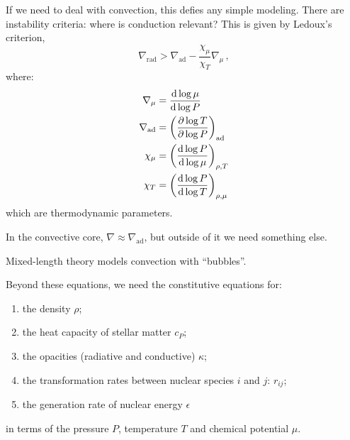 \documentclass[main.tex]{subfiles}
\begin{document}
If we need to deal with convection, this defies any simple modeling. There are instability criteria: where is conduction relevant? This is given by
Ledoux's criterion,
%
\begin{equation}
    \nabla_{\text{rad}} > \nabla_{\text{ad}} - \frac{\chi_\mu}{\chi_T} \nabla_\mu\,,
\end{equation}
%
where:
%
\begin{subequations}
\begin{align}
  \nabla_\mu  &= \dv{\log \mu }{\log P} \\
  \nabla_{\text{ad}}  &= \qty(\pdv{\log T }{\log P} )_{\text{ad}} \\
  \chi_{\mu}  &= \qty(\dv{\log P }{\log \mu} )_{\rho, T} \\
  \chi_{T}  &= \qty(\dv{\log P }{\log T} )_{\rho, \mu}
\end{align}
\end{subequations}
%
which are thermodynamic parameters.


In the convective core, \(\nabla \approx \nabla_{\text{ad}}\), but outside of it we need something else.

Mixed-length theory models convection with ``bubbles''.

Beyond these equations, we need the constitutive equations for:
\begin{enumerate}
    \item the density \(\rho \);
    \item the heat capacity of stellar matter \(c_P\);
    \item the opacities (radiative and conductive) \(\kappa \);
    \item the transformation rates between nuclear species \(i\) and \(j\): \(r_{ij}\);
    \item the generation rate of nuclear energy \(\epsilon \)
\end{enumerate}
in terms of the pressure \(P\), temperature \(T\) and chemical potential \(\mu \).
\end{document}

